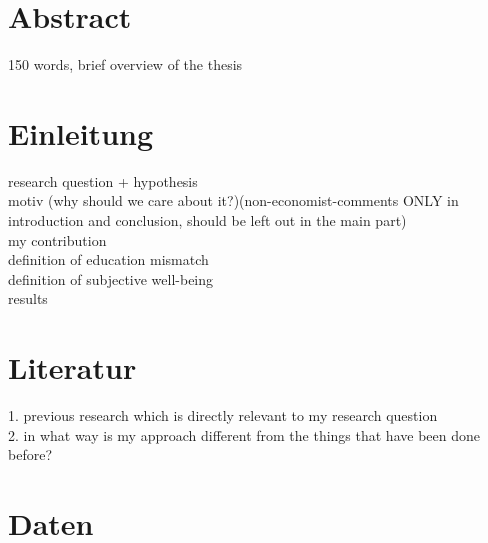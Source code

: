 \documentclass[a4paper,11pt]{scrartcl}
\begin{document}

	
\newpage 
\tableofcontents

\newpage
\listoftables

\newpage
\listoffigures

\newpage
\section{Abstract}
150 words, brief overview of the thesis

\newpage
\section{Einleitung}
research question + hypothesis \\
motiv (why should we care about it?)(non-economist-comments ONLY in introduction and conclusion, should be left out in the main part)\\
my contribution\\
definition of education mismatch\\
definition of subjective well-being\\
results\\

\newpage 
\section{Literatur}
1. previous research which is directly relevant to my research question\\
2. in what way is my approach different from the things that have been done before?

	
\newpage 
\section{Daten}
\end{document}
